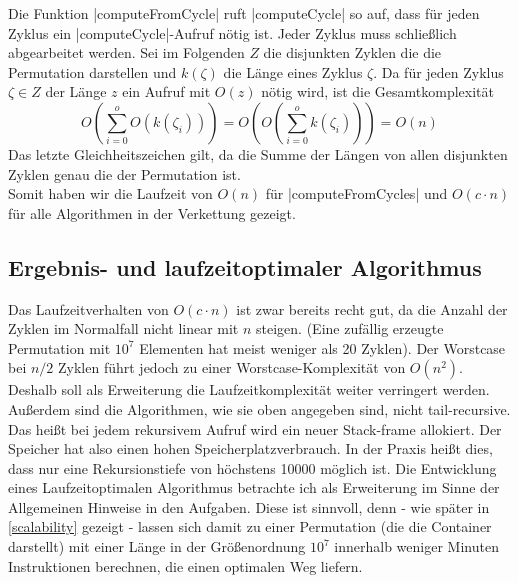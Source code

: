 Die Funktion |computeFromCycle| ruft |computeCycle| so auf, dass für jeden Zyklus ein |computeCycle|-Aufruf nötig ist. Jeder Zyklus muss schließlich abgearbeitet werden.
Sei im Folgenden $Z$ die disjunkten Zyklen die die Permutation darstellen und $k(\zeta)$ die Länge eines Zyklus $\zeta$.
Da für jeden Zyklus $\zeta \in Z$ der Länge $z$ ein Aufruf mit $O(z)$ nötig wird, ist die Gesamtkomplexität
\[O(\sum_{i=0}^{o}{O(k(\zeta_i))})=O(O(\sum_{i=0}^{o}{k(\zeta_i)}))=O(n)\]
Das letzte Gleichheitszeichen gilt, da die Summe der Längen von allen disjunkten Zyklen genau die der Permutation ist.\\
Somit haben wir die Laufzeit von $O(n)$ für |computeFromCycles| und $O(c \cdot n)$ für alle Algorithmen in der Verkettung gezeigt.
\clearpage
\subsection{Ergebnis- und laufzeitoptimaler Algorithmus} %
Das Laufzeitverhalten von $O(c \cdot n)$ ist zwar bereits recht gut, da die Anzahl der Zyklen im Normalfall nicht linear mit $n$ steigen.
(Eine zufällig erzeugte Permutation mit $10^7$ Elementen hat meist weniger als 20 Zyklen).
Der Worstcase bei $n/2$ Zyklen führt jedoch zu einer Worstcase-Komplexität von $O(n^2)$. \\
Deshalb soll als Erweiterung die Laufzeitkomplexität weiter verringert werden. \\

Außerdem sind die Algorithmen, wie sie oben angegeben sind, nicht tail-recursive.
Das heißt bei jedem rekursivem Aufruf wird ein neuer Stack-frame allokiert.
Der Speicher hat also einen hohen Speicherplatzverbrauch.
In der Praxis heißt dies, dass nur eine Rekursionstiefe von höchstens 10000 möglich ist.
Die Entwicklung eines Laufzeitoptimalen Algorithmus betrachte ich als Erweiterung im Sinne der Allgemeinen Hinweise in den Aufgaben.
Diese ist sinnvoll, denn - wie später in \ref{scalability} gezeigt -
lassen sich damit zu einer Permutation (die die Container darstellt)
mit einer Länge in der Größenordnung $10^7$ innerhalb weniger Minuten Instruktionen berechnen, die einen optimalen Weg liefern.
